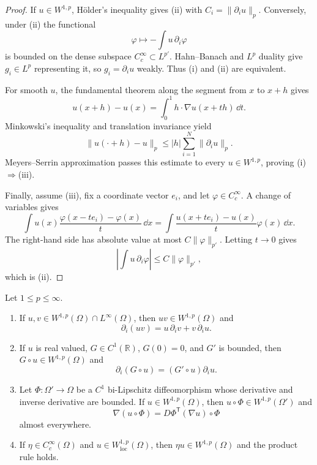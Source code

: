 \begin{proof}
If $u\in W^{1,p}$, Hölder's inequality gives (ii) with
$C_i=\|\partial_i u\|_p$.  Conversely, under (ii) the functional
\[
  \varphi\longmapsto-\int u\,\partial_i\varphi
\]
is bounded on the dense subspace $C_c^\infty\subset L^{p'}$.  Hahn--Banach and
$L^p$ duality give $g_i\in L^p$ representing it, so
$g_i=\partial_i u$ weakly.  Thus (i) and (ii) are equivalent.

For smooth $u$, the fundamental theorem along the segment from $x$ to $x+h$
gives
\[
  u(x+h)-u(x)=\int_0^1 h\cdot\nabla u(x+th)\,\dd t.
\]
Minkowski's inequality and translation invariance yield
\[
  \|u(\cdot+h)-u\|_p
  \le |h|\sum_{i=1}^N\|\partial_i u\|_p.
\]
Meyers--Serrin approximation passes this estimate to every
$u\in W^{1,p}$, proving (i)$\Rightarrow$(iii).

Finally, assume (iii), fix a coordinate vector $e_i$, and let
$\varphi\in C_c^\infty$.  A change of variables gives
\[
  \int u(x)\frac{\varphi(x-te_i)-\varphi(x)}{t}\,\dd x
  =\int\frac{u(x+te_i)-u(x)}{t}\varphi(x)\,\dd x.
\]
The right-hand side has absolute value at most $C\|\varphi\|_{p'}$.  Letting
$t\to0$ gives
\[
  \left|\int u\,\partial_i\varphi\right|
  \le C\|\varphi\|_{p'},
\]
which is (ii).
\end{proof}

\begin{noteproposition}
Let $1\le p\le\infty$.
\begin{enumerate}
  \item If $u,v\in W^{1,p}(\Omega)\cap L^\infty(\Omega)$, then
        $uv\in W^{1,p}(\Omega)$ and
        \[
          \partial_i(uv)=u\,\partial_i v+v\,\partial_i u.
        \]
  \item If $u$ is real valued, $G\in C^1(\mathbb R)$,
        $G(0)=0$, and $G'$ is bounded, then
        $G\circ u\in W^{1,p}(\Omega)$ and
        \[
          \partial_i(G\circ u)=(G'\circ u)\partial_i u.
        \]
  \item Let $\Phi\colon\Omega'\to\Omega$ be a $C^1$ bi-Lipschitz
        diffeomorphism whose derivative and inverse derivative are bounded.
        If $u\in W^{1,p}(\Omega)$, then $u\circ\Phi\in W^{1,p}(\Omega')$ and
        \[
          \nabla(u\circ\Phi)
          =D\Phi^{\mathsf T}(\nabla u)\circ\Phi
        \]
        almost everywhere.
  \item If $\eta\in C_c^\infty(\Omega)$ and
        $u\in W^{1,p}_{\mathrm{loc}}(\Omega)$, then
        $\eta u\in W^{1,p}(\Omega)$ and the product rule holds.
\end{enumerate}
\end{noteproposition}

